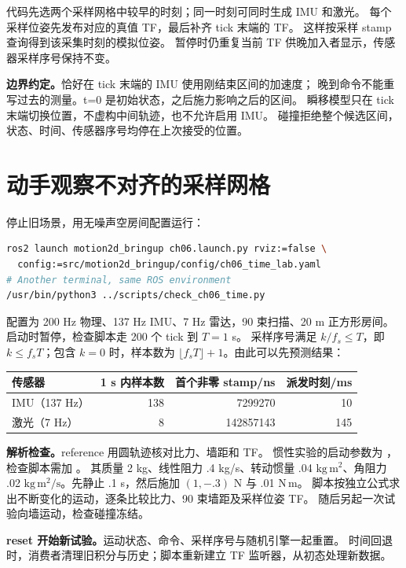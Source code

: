 代码先选两个采样网格中较早的时刻；同一时刻可同时生成 IMU 和激光。
每个采样位姿先发布对应的真值 TF，最后补齐 tick 末端的 TF。
这样按采样 stamp 查询得到该采集时刻的模拟位姿。
暂停时仍重复当前 TF 供晚加入者显示，传感器采样序号保持不变。

\textbf{边界约定。}恰好在 tick 末端的 IMU 使用刚结束区间的加速度；
晚到命令不能重写过去的测量。t=0 是初始状态，之后施力影响之后的区间。
瞬移模型只在 tick 末端切换位置，不虚构中间轨迹，也不允许启用 IMU。
碰撞拒绝整个候选区间，状态、时间、传感器序号均停在上次接受的位置。

\section{动手观察不对齐的采样网格}
停止旧场景，用无噪声空房间配置运行：
\begin{lstlisting}[language=bash,numbers=none]
ros2 launch motion2d_bringup ch06.launch.py rviz:=false \
  config:=src/motion2d_bringup/config/ch06_time_lab.yaml
# Another terminal, same ROS environment
/usr/bin/python3 ../scripts/check_ch06_time.py
\end{lstlisting}
配置为 200 Hz 物理、137 Hz IMU、7 Hz 雷达，90 束扫描、20 m 正方形房间。
启动时暂停，检查脚本走 200 个 tick 到 $T=1$ s。
采样序号满足 $k/f_s\le T$，即 $k\le f_sT$；包含 $k=0$ 时，样本数为
$\lfloor f_sT\rfloor+1$。由此可以先预测结果：
\begin{center}
\begin{tabular}{lrrr}
\toprule
传感器 & 1 s 内样本数 & 首个非零 stamp/ns & 派发时刻/ms\\
\midrule
IMU（137 Hz） & 138 & 7299270 & 10\\
激光（7 Hz） & 8 & 142857143 & 145\\
\bottomrule
\end{tabular}
\end{center}

\textbf{解析检查。}reference 用圆轨迹核对比力、墙距和 TF。
惯性实验的启动参数为 ，检查脚本需加
。
其质量 2 kg、线性阻力 .4 kg/s、转动惯量 .04 $\mathrm{kg\,m^2}$、角阻力 .02
$\mathrm{kg\,m^2/s}$。先静止 .1 s，然后施加 $(1,-.3)$ N 与 .01 N\,m。
脚本按独立公式求出不断变化的运动，逐条比较比力、90 束墙距及采样位姿 TF。
随后另起一次试验向墙运动，检查碰撞冻结。

\textbf{reset 开始新试验。}运动状态、命令、采样序号与随机引擎一起重置。
时间回退时，消费者清理旧积分与历史；脚本重新建立 TF 监听器，从初态处理新数据。

